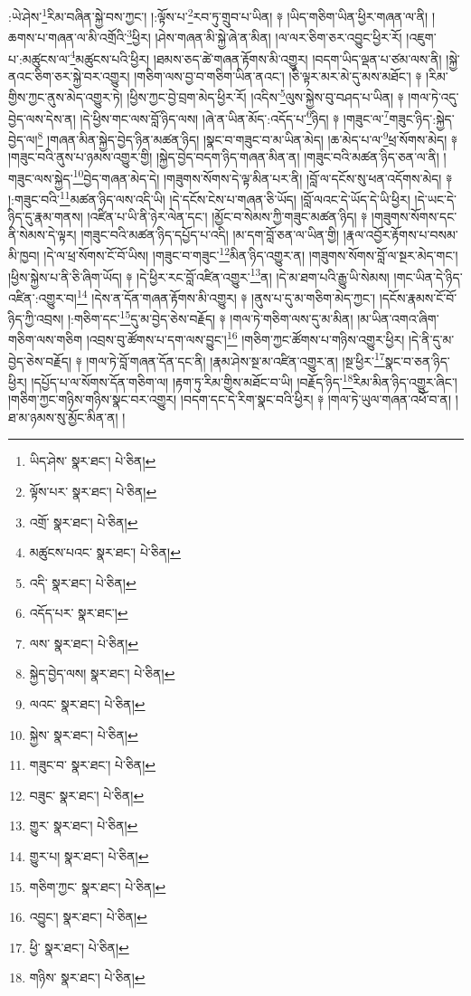 :ཡེ་ཤེས་\footnote{ཡིད་ཤེས་  སྣར་ཐང་།  པེ་ཅིན། }རིམ་བཞིན་སྐྱེ་བས་ཀྱང་། །:ལྟོས་པ་\footnote{ལྟོས་པར་  སྣར་ཐང་།  པེ་ཅིན། }རབ་ཏུ་གྲུབ་པ་ཡིན། ༈ །ཡིད་གཅིག་ཡིན་ཕྱིར་གཞན་ལ་ནི། །ཆགས་པ་གཞན་ལ་མི་འགྲོའི་\footnote{འགྲོ་  སྣར་ཐང་།  པེ་ཅིན། }ཕྱིར། །ཤེས་གཞན་མི་སྐྱེ་ཞེ་ན་མིན། །ལ་ལར་ཅིག་ཅར་འབྱུང་ཕྱིར་རོ། །འཇུག་པ་:མཚུངས་ལ་\footnote{མཚུངས་པའང་  སྣར་ཐང་།  པེ་ཅིན། }མཚུངས་པའི་ཕྱིར། །ཐམས་ཅད་ཚེ་གཞན་རྟོགས་མི་འགྱུར། །བདག་ཡིད་ལྡན་པ་ཙམ་ལས་ནི། །སྐྱེ་ནའང་ཅིག་ཅར་སྐྱེ་བར་འགྱུར། །གཅིག་ལས་བྱ་བ་གཅིག་ཡིན་ནའང་། །ཅི་ལྟར་མར་མེ་དུ་མས་མཐོང་། ༈ །རིམ་གྱིས་ཀྱང་ནུས་མེད་འགྱུར་ཏེ། །ཕྱིས་ཀྱང་བྱེ་བྲག་མེད་ཕྱིར་རོ། །འདིས་\footnote{འདི་  སྣར་ཐང་།  པེ་ཅིན། }ལུས་སྐྱེས་བུ་བཤད་པ་ཡིན། ༈ །གལ་ཏེ་འདུ་བྱེད་ལས་དེས་ན། །དེ་ཕྱིས་གང་ལས་བློ་ཉིད་ལས། །ཞེ་ན་ཡིན་མོད་:འདོད་པ་\footnote{འདོད་པར་  སྣར་ཐང་། }ཉིད། ༈ །གཟུང་ལ་\footnote{ལས་  སྣར་ཐང་།  པེ་ཅིན། }གཟུང་ཉིད་:སྐྱེད་བྱེད་ལ།\footnote{སྐྱེད་བྱེད་ལས།  སྣར་ཐང་།  པེ་ཅིན། } །གཞན་མིན་སྐྱེད་བྱེད་ཉིན་མཚན་ཉིད། །སྣང་བ་གཟུང་བ་མ་ཡིན་མེད། །ཆ་མེད་པ་ལ་\footnote{ལའང་  སྣར་ཐང་།  པེ་ཅིན། }ཕྲ་སོགས་མེད། ༈ །གཟུང་བའི་ནུས་པ་ཉམས་འགྱུར་གྱི། །སྐྱེད་བྱེད་བདག་ཉིད་གཞན་མིན་ན། །གཟུང་བའི་མཚན་ཉིད་ཅན་ལ་ནི། །གཟུང་ལས་སྐྱེད་\footnote{སྐྱེས་  སྣར་ཐང་།  པེ་ཅིན། }བྱེད་གཞན་མེད་དེ། །གཟུགས་སོགས་དེ་ལྟ་མིན་པར་ནི། །བློ་ལ་དངོས་སུ་ཕན་འདོགས་མེད། ༈ །:གཟུང་བའི་\footnote{གཟུང་བ་  སྣར་ཐང་།  པེ་ཅིན། }མཚན་ཉིད་ལས་འདི་ཡི། །དེ་དངོས་ངེས་པ་གཞན་ཅི་ཡོད། །བློ་ལའང་དེ་ཡོད་དེ་ཡི་ཕྱིར། །དེ་ཡང་དེ་ཉིད་དུ་རྣམ་གནས། །འཛིན་པ་ཡི་ནི་ཉེར་ལེན་དང་། །མྱོང་བ་སེམས་ཀྱི་གཟུང་མཚན་ཉིད། ༈ །གཟུགས་སོགས་དང་ནི་སེམས་དེ་ལྟར། །གཟུང་བའི་མཚན་ཉིད་དཔྱོད་པ་འདི། །མ་དག་བློ་ཅན་ལ་ཡིན་གྱི། །རྣལ་འབྱོར་རྟོགས་པ་བསམ་མི་ཁྱབ། །དེ་ལ་ཕྲ་སོགས་ངོ་བོ་ཡིས། །གཟུང་བ་གཟུང་\footnote{བཟུང་  སྣར་ཐང་།  པེ་ཅིན། }མིན་ཉིད་འགྱུར་ན། །གཟུགས་སོགས་བློ་ལ་སྔར་མེད་གང་། །ཕྱིས་སྐྱེས་པ་ནི་ཅི་ཞིག་ཡོད། ༈ །དེ་ཕྱིར་རང་བློ་འཛིན་འགྱུར་\footnote{གྱུར་  སྣར་ཐང་།  པེ་ཅིན། }ན། །དེ་མ་ཐག་པའི་རྒྱུ་ཡི་སེམས། །གང་ཡིན་དེ་ཉིད་འཛིན་:འགྱུར་བ།\footnote{གྱུར་པ།  སྣར་ཐང་།  པེ་ཅིན། } །དེས་ན་དོན་གཞན་རྟོགས་མི་འགྱུར། ༈ །ནུས་པ་དུ་མ་གཅིག་མེད་ཀྱང་། །དངོས་རྣམས་ངོ་བོ་ཉིད་ཀྱི་འབྲས། །:གཅིག་དང་\footnote{གཅིག་ཀྱང་  སྣར་ཐང་།  པེ་ཅིན། }དུ་མ་བྱེད་ཅེས་བརྗོད། ༈ །གལ་ཏེ་གཅིག་ལས་དུ་མ་མིན། །མ་ཡིན་འགའ་ཞིག་གཅིག་ལས་གཅིག །འབྲས་བུ་ཚོགས་པ་དག་ལས་བྱུང་།\footnote{འབྱུང་།  སྣར་ཐང་།  པེ་ཅིན། } །གཅིག་ཀྱང་ཚོགས་པ་གཉིས་འགྱུར་ཕྱིར། །དེ་ནི་དུ་མ་བྱེད་ཅེས་བརྗོད། ༈ །གལ་ཏེ་བློ་གཞན་དོན་དང་ནི། །རྣམ་ཤེས་སྔ་མ་འཛིན་འགྱུར་ན། །སྔ་ཕྱིར་\footnote{ཕྱི་  སྣར་ཐང་།  པེ་ཅིན། }སྣང་བ་ཅན་ཉིད་ཕྱིར། །དཔྱོད་པ་ལ་སོགས་དོན་གཅིག་ལ། །རྟག་ཏུ་རིམ་གྱིས་མཐོང་བ་ཡི། །བརྗོད་ཉིད་\footnote{གཉིས་  སྣར་ཐང་།  པེ་ཅིན། }རིམ་མིན་ཉིད་འགྱུར་ཞིང་། །གཅིག་ཀྱང་གཉིས་གཉིས་སྣང་བར་འགྱུར། །བདག་དང་དེ་རིག་སྣང་བའི་ཕྱིར། ༈ །གལ་ཏེ་ཡུལ་གཞན་འཕོ་བ་ན། །ཐ་མ་ཉམས་སུ་མྱོང་མིན་ན། །
